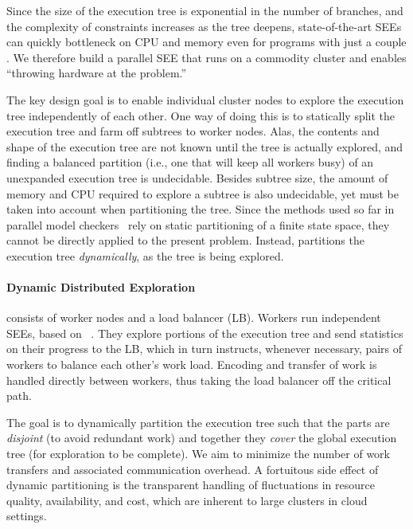 
Since the size of the execution tree is exponential in the number of branches, and the complexity of constraints increases as the tree deepens, state-of-the-art SEEs can quickly bottleneck on CPU and memory even for programs with just a couple \kloc.  We therefore build a parallel SEE that runs on a commodity cluster and enables ``throwing hardware at the problem.''

The key design goal is to enable individual cluster nodes to explore the execution tree independently of each other.  One way of doing this is to statically split the execution tree and farm off subtrees to worker nodes.  Alas, the contents and shape of the execution tree are not known until the tree is actually explored, and finding a balanced partition (i.e., one that will keep all workers busy) of an unexpanded execution tree is undecidable.  Besides subtree size, the amount of  memory and CPU required to explore a subtree is also undecidable, yet must be taken into account when partitioning the tree. Since the methods used so far in parallel model checkers~\cite{swarm,spin:multicore-modelchecking} rely on static partitioning of a finite state space, they cannot be directly applied to the present problem. Instead, \cnine partitions the execution tree {\em dynamically}, as the tree is being explored. 

\paragraph{Dynamic Distributed Exploration}

\cnine consists of wor\-ker nodes and a load balancer (LB).  Workers run independent SEEs, based on \klee~\cite{klee}.  They explore portions of the execution tree and send statistics on their progress to the LB, which in turn instructs, whenever necessary, pairs of workers to balance each other's work load.  Encoding and transfer of work is handled directly between workers, thus taking the load balancer off the critical path.

The goal is to dynamically partition the execution tree such that the parts are {\em disjoint} (to avoid redundant work) and together they {\em cover} the global execution tree (for exploration to be complete).  We aim to minimize the number of work transfers and associated communication overhead.  A fortuitous side effect of dynamic partitioning is the transparent handling of fluctuations in resource quality, availability, and cost, which are inherent to large clusters in cloud settings.

